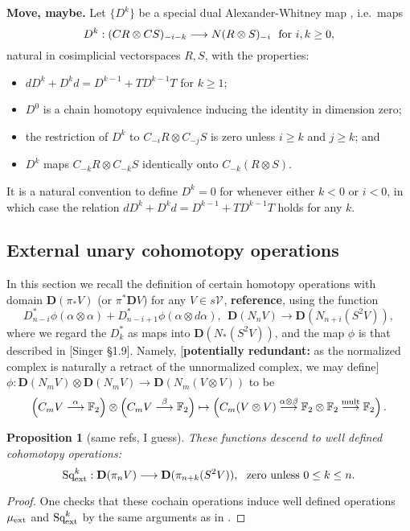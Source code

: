 \documentclass[11pt]{amsart}
\theoremstyle{plain}
\newtheorem{prop}[thm]{Proposition}
\theoremstyle{definition}
\let\oldphi\phi
\let\phi\varphi
\renewcommand{\to}{\longrightarrow}
\newcommand{\calV}{\mathcal{V}}
\theoremstyle{plain}
\newcommand{\vect}[2]{\calV^{#1}_{#2}}
\newcommand{\ExtCohOp}{\textup{Sq}_\textup{ext}}
\newcommand{\ExtCohProd}{\mu_\textup{ext}}
\newcommand{\F}{\mathbb{F}}
\newcommand{\dual}{\mathbf{D}}
\begin{document}
\begin{Constructing homotopy and cohomotopy operations}
\begin{shaded}
\textbf{Move, maybe.}
Let $\{D^k\}$ be a special dual Alexander-Whitney map \cite[Proposition 5.2]{turner_opns_and_sseqs_I.pdf}, i.e.\  maps
\[D^k:(CR\otimes CS)_{-i-k}\to N(R\otimes S)_{-i}\textup{\ \ for $i,k\geq0$},\]
natural in cosimplicial vectorspaces $R,S$,
with the properties:
\begin{itemize}
\setlength{\parindent}{.25in}
\item $dD^k+D^kd=D^{k-1}+TD^{k-1}T$ for $k\geq1$;
\item $D^0$ is a chain homotopy equivalence inducing the identity in dimension zero;
\item the restriction of $D^k$ to $C_{-i}R\otimes C_{-j}S$ is zero unless $i\geq k$ and $j\geq k$; and
\item $D^k$ maps $C_{-k}R\otimes C_{-k}S$ identically onto $C_{-k}(R\otimes S)$.
\end{itemize}
It is a natural convention to define $D^k=0$ for whenever either $k<0$ or $i<0$, in which case the relation $dD^k+D^kd=D^{k-1}+TD^{k-1}T$ holds for any $k$.
\end{shaded}

\subsection{External unary cohomotopy operations}
In this section we recall the definition of certain homotopy operations with domain $\dual(\pi_*V)$ (or $\pi^*\dual V$) for any $V\in s\vect{}{}$, \textbf{reference}, using the function
\[D^*_{n-i}\oldphi(\alpha\otimes \alpha)+D^*_{n-i+1}\oldphi(\alpha\otimes d\alpha),\ \ \dual(N_nV) \to \dual(N_{n+i}(S^2V)),\]
where we regard the $D^*_k$ as maps into $\dual(N_*(S^2V))$, and the map $\oldphi$ is that described in [Singer \S1.9]. Namely, [\textbf{potentially redundant:} as the normalized complex is naturally a retract of the unnormalized complex, we may define] $\oldphi:\dual\left(N_mV\right)\otimes \dual\left(N_mV\right)\to \dual\left(N_m(V\otimes V)\right)$ to be
\[\left(C_mV\overset{\alpha}{\to}\F_2\right)\otimes \left(C_mV\overset{\beta}{\to}\F_2\right)\mapsto\left(C_m(V\otimes V)\overset{\alpha\otimes\beta}{\to}\F_2\otimes \F_2\overset{\textup{mult}}{\to}\F_2\right).\]
\begin{prop}[same refs, I guess] \label{extUnaryCohomotOps}
These functions descend to  well defined cohomotopy operations:
\[\ExtCohOp^k:\dual(\pi_{n}V)\to \dual(\pi_{n+k}(S^2V)),\text{ \ zero unless $0\leq k\leq n$.}\]
\end{prop}
\begin{proof}
One checks that these cochain operations induce well defined operations $\ExtCohProd$ and $\ExtCohOp^k$ by the same arguments as in \cite[\S1.12]{MR2245560}.
\end{proof}


\end{Constructing homotopy and cohomotopy operations}
\end{document}
